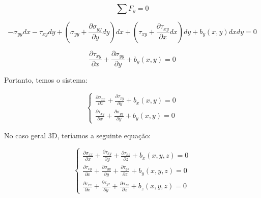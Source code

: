         \begin{equation*}
            \sum F_y = 0
        \end{equation*}

        \begin{equation*}
            -\sigma_{yy}dx - \tau_{xy}dy + 
            \left(\sigma_{yy} + \frac{\partial \sigma_{yy}}{\partial y} dy\right) dx +
            \left(\tau_{xy} + \frac{\partial \tau_{xy}}{\partial x} dx\right) dy +
            b_y(x,y) dx dy = 0
        \end{equation*}

        \begin{equation*}
            \frac{\partial \tau_{xy}}{\partial x} +
            \frac{\partial \sigma_{yy}}{\partial y} +
            b_y(x,y) = 0
        \end{equation*}

        Portanto, temos o sistema:

        \begin{equation}
            \left\{
            \begin{array}{l}
                 \frac{\partial \sigma_{xx}}{\partial x} + \frac{\partial \tau_{xy}}{\partial y} + b_x(x,y) = 0\\
                 \frac{\partial \tau_{xy}}{\partial x} + \frac{\partial \sigma_{yy}}{\partial y} + b_y(x,y) = 0
            \end{array}
            \right.
            \label{eq:equilibrio2D}
        \end{equation}

        No caso geral 3D, teríamos a seguinte equação:

        \begin{equation}
            \left\{
            \begin{array}{l}
                 \frac{\partial \sigma_{xx}}{\partial x} + \frac{\partial \tau_{xy}}{\partial y} + \frac{\partial \tau_{xz}}{\partial z} + b_x(x,y,z) = 0\\
                 \frac{\partial \tau_{xy}}{\partial x} + \frac{\partial \sigma_{yy}}{\partial y} + \frac{\partial \tau_{yz}}{\partial z} + b_y(x,y,z) = 0\\
                 \frac{\partial \tau_{xz}}{\partial x} + \frac{\partial \tau_{yz}}{\partial y} + \frac{\partial \sigma_{zz}}{\partial z} + b_z(x,y,z) = 0
            \end{array}
            \right.
        \end{equation}


